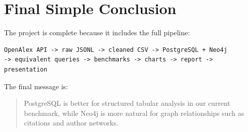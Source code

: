 \documentclass[11pt]{article}
\begin{document}
\section{Final Simple Conclusion}

The project is complete because it includes the full pipeline:

\begin{verbatim}
OpenAlex API -> raw JSONL -> cleaned CSV -> PostgreSQL + Neo4j
-> equivalent queries -> benchmarks -> charts -> report -> presentation
\end{verbatim}

The final message is:

\begin{quote}
PostgreSQL is better for structured tabular analysis in our current benchmark, while Neo4j is more natural for graph relationships such as citations and author networks.
\end{quote}
\end{document}
